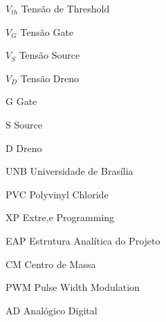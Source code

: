 \begin{siglas}
  \item [$V_{th}$] Tensão de Threshold
  \item [$V_{G}$] Tensão Gate
  \item [$V_{S}$] Tensão Source
  \item [$V_{D}$] Tensão Dreno
  \item [G] Gate
  \item [S] Source
  \item [D] Dreno
  \item [UNB] Universidade de Brasília
  \item [PVC] Polyvinyl Chloride
  \item [XP] Extre,e Programming
  \item [EAP] Estrutura Analítica do Projeto
  \item [CM] Centro de Massa
  \item [PWM] Pulse Width Modulation
  \item [AD] Analógico Digital
\end{siglas}
